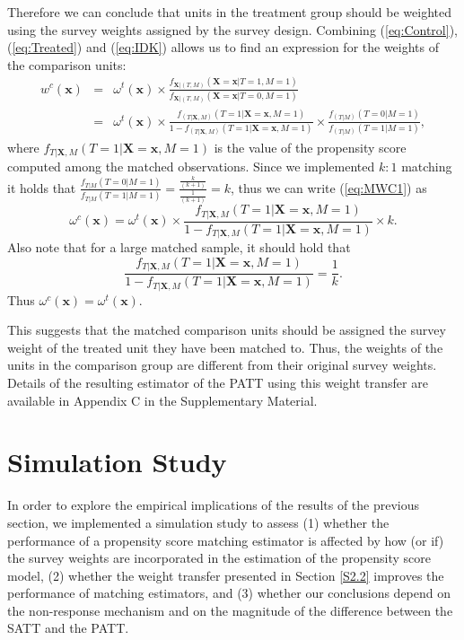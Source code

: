 \documentclass[oupdraft]{bio}
\begin{document}
Therefore we can conclude that units in the treatment group should be weighted using the survey weights assigned by the survey design.  
Combining (\ref{eq:Control}), (\ref{eq:Treated}) and (\ref{eq:IDK}) allows us to find an expression for the weights of the comparison units:
\begin{eqnarray}
w^{c}(\textbf{x}) & = & \omega^{t}(\textbf{x})\times\frac{f_{\mathbf{X}|(T,M)}         (\mathbf{X=x}|T=1,M=1)}{f_{\mathbf{X}|(T,M)}(\mathbf{X=x}|T=0,M=1)}\nonumber \\
 & = & \omega^{t}(\textbf{x})\times\frac{f_{(T|\mathbf{X},M)}(T=1|\mathbf{X=x},M=1)}{1-f_{(T|\mathbf{X},M)}(T=1|\mathbf{X=x},M=1)}\times\frac{f_{(T|M)}(T=0|M=1)}{f_{(T|M)}(T=1|M=1)}, \label{eq:MWC1}
\end{eqnarray}
where $f_{T|\mathbf{X},M}(T=1|\mathbf{X=x},M=1)$ is the value of
the propensity score computed among the matched observations. Since
we implemented $k:1$ matching it holds that $\displaystyle\frac{f_{T|M}(T=0|M=1)}{f_{T|M}(T=1|M=1)}=\frac{\frac{k}{(k+1)}}{\frac{1}{(k+1)}}=k$,
thus we can write (\ref{eq:MWC1}) as
\[
\omega^{c}(\textbf{x})=\omega^{t}(\textbf{x})\times\frac{f_{T|\mathbf{X},M}(T=1|\mathbf{X=x},M=1)}{1-f_{T|\mathbf{X},M}(T=1|\mathbf{X=x},M=1)}\times k.
\]
Also note that for a large matched sample, it should hold that
\[
\frac{f_{T|\mathbf{X},M}(T=1|\mathbf{X=x},M=1)}{1-f_{T|\mathbf{X},M}(T=1|\mathbf{X=x},M=1)}=\frac{1}{k}.
\]
Thus $\omega^{c}(\textbf{x})=\omega^{t}(\textbf{x})$.

This suggests that the matched comparison units should be assigned the survey weight of the treated unit they have been matched to. Thus, the weights of the units in the comparison group are different from their original survey weights.  Details of the resulting estimator of the PATT using this weight transfer are available in Appendix C in the Supplementary Material. 


\section{Simulation Study}
\label{S3}
In order to explore the empirical implications of the results of the previous section, we implemented a simulation study to assess (1) whether the performance of a propensity score matching estimator is affected by how (or if) the survey weights are incorporated in the estimation of the propensity score model, (2) whether the weight transfer presented in Section \ref{S2.2} improves the performance of matching estimators, and (3) whether our conclusions depend on the non-response mechanism and on the magnitude of the difference between the SATT and the PATT.
\end{document}
